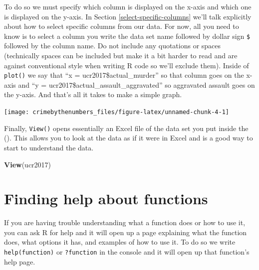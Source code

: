 \documentclass[
  12pt,
]{book}
\newenvironment{Shaded}{\begin{snugshade}}{\end{snugshade}}
\newcommand{\DataTypeTok}[1]{\textcolor[rgb]{0.27,0.27,0.27}{#1}}
\newcommand{\KeywordTok}[1]{\textcolor[rgb]{0.27,0.27,0.27}{\textbf{#1}}}
\newcommand{\NormalTok}[1]{#1}
\newcommand{\OperatorTok}[1]{\textcolor[rgb]{0.43,0.43,0.43}{\textbf{#1}}}
\begin{document}
To do so we must specify which column is displayed on the x-axis and which one is displayed on the y-axis. In Section \ref{select-specific-columns} we'll talk explicitly about how to select specific columns from our data. For now, all you need to know is to select a column you write the data set name followed by dollar sign \texttt{\$} followed by the column name. Do not include any quotations or spaces (technically spaces can be included but make it a bit harder to read and are against conventional style when writing R code so we'll exclude them). Inside of \texttt{plot()} we say that ``x = ucr2017\$actual\_murder'' so that column goes on the x-axis and ``y = ucr2017\$actual\_assault\_aggravated'' so aggravated assault goes on the y-axis. And that's all it takes to make a simple graph.

\begin{Shaded}
\end{Shaded}

\begin{center}\texttt{[image: crimebythenumbers\_files/figure-latex/unnamed-chunk-4-1]} \end{center}

Finally, \texttt{View()} opens essentially an Excel file of the data set you put inside the (). This allows you to look at the data as if it were in Excel and is a good way to start to understand the data.

\begin{Shaded}
\begin{Highlighting}[]
\KeywordTok{View}\NormalTok{(ucr2017)}
\end{Highlighting}
\end{Shaded}

\hypertarget{finding-help-about-functions}{%
\section{Finding help about functions}\label{finding-help-about-functions}}

If you are having trouble understanding what a function does or how to use it, you can ask R for help and it will open up a page explaining what the function does, what options it has, and examples of how to use it. To do so we write \texttt{help(function)} or \texttt{?function} in the console and it will open up that function's help page.
\end{document}
